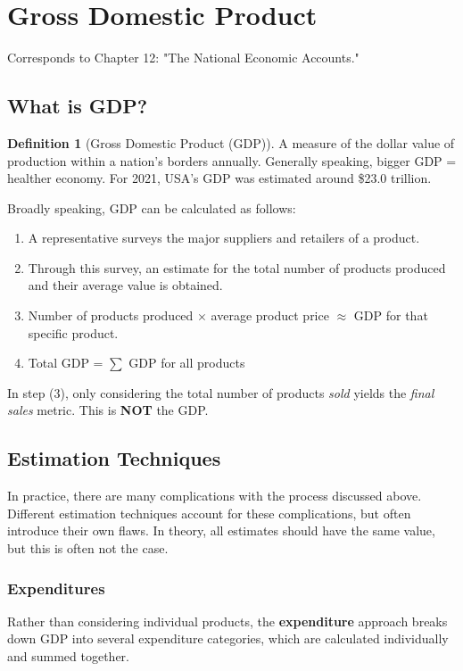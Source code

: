 \documentclass[12pt, a4paper]{article}
\theoremstyle{definition}
\newtheorem{definition}{Definition}
\begin{document}
\newpage

\section{Gross Domestic Product}
Corresponds to Chapter 12: "The National Economic Accounts."

\subsection{What is GDP?}
\begin{definition}[Gross Domestic Product (GDP)]
    A measure of the dollar value of production within a nation's borders annually.
    Generally speaking, bigger GDP = healther economy.
    For 2021, USA's GDP was estimated around \$23.0 trillion.
\end{definition}

Broadly speaking, GDP can be calculated as follows:
\begin{enumerate}
    \item A representative surveys the major suppliers and retailers of a product.
    \item Through this survey, an estimate for the total number of products produced and their average value is obtained.
    \item Number of products produced $\times$ average product price $\approx$ GDP for that specific product.
    \item Total GDP = $\sum$ GDP for all products
\end{enumerate}

In step (3), only considering the total number of products \textit{sold} yields the \textit{final sales} metric.
This is \textbf{NOT} the GDP.

\subsection{Estimation Techniques}
In practice, there are many complications with the process discussed above.
Different estimation techniques account for these complications, but often introduce their own flaws.
In theory, all estimates should have the same value, but this is often not the case.

\subsubsection{Expenditures}
Rather than considering individual products, the \textbf{expenditure} approach breaks down GDP into several expenditure categories, which are calculated individually and summed together.
\end{document}
